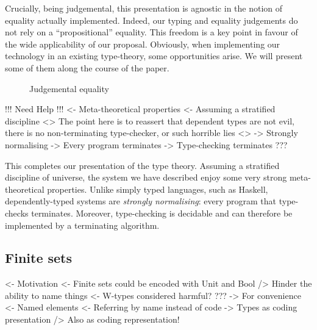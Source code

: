 Crucially, being judgemental, this presentation is agnostic in the
notion of equality actually implemented. Indeed, our typing and
equality judgements do not rely on a ``propositional'' equality. This
freedom is a key point in favour of the wide applicability of our
proposal. Obviously, when implementing our technology in an existing
type-theory, some opportunities arise. We will present some of them
along the course of the paper. 


\begin{figure}



\caption{Judgemental equality}
\label{fig:judgemental-equality}

\end{figure}



\begin{wstructure}
!!! Need Help !!!
<- Meta-theoretical properties
    <- Assuming a stratified discipline
    <> The point here is to reassert that dependent types are not evil, 
       there is no non-terminating type-checker, or such horrible lies <>
    -> Strongly normalising
        -> Every program terminates
    -> Type-checking terminates
    ???
\end{wstructure}

This completes our presentation of the type theory. Assuming a
stratified discipline of universe, the system we have described enjoy
some very strong meta-theoretical properties. Unlike simply typed
languages, such as Haskell, dependently-typed systems are
\emph{strongly normalising}: every program that type-checks
terminates. Moreover, type-checking is decidable and can therefore be
implemented by a terminating algorithm.


\subsection{Finite sets}
\label{sec:finite-sets}

\begin{wstructure}
<- Motivation
    <- Finite sets could be encoded with Unit and Bool
        /> Hinder the ability to name things
    <- W-types considered harmful?
        ???
    -> For convenience
        <- Named elements
        <- Referring by name instead of code
        -> Types as coding presentation
            /> Also as coding representation!
\end{wstructure}

